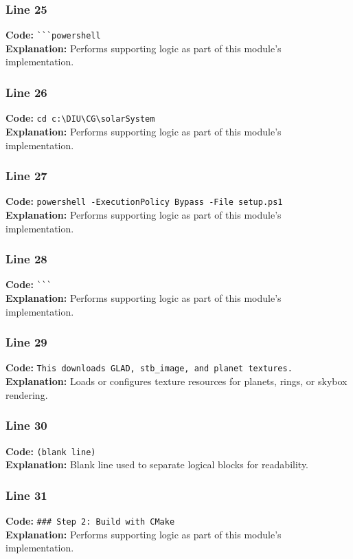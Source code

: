 \documentclass[11pt,a4paper]{article}
\begin{document}
\subsubsection*{Line 25}
\textbf{Code:} \verb|```powershell|\\
\textbf{Explanation:} Performs supporting logic as part of this module's implementation.

\subsubsection*{Line 26}
\textbf{Code:} \verb|cd c:\DIU\CG\solarSystem|\\
\textbf{Explanation:} Performs supporting logic as part of this module's implementation.

\subsubsection*{Line 27}
\textbf{Code:} \verb|powershell -ExecutionPolicy Bypass -File setup.ps1|\\
\textbf{Explanation:} Performs supporting logic as part of this module's implementation.

\subsubsection*{Line 28}
\textbf{Code:} \verb|```|\\
\textbf{Explanation:} Performs supporting logic as part of this module's implementation.

\subsubsection*{Line 29}
\textbf{Code:} \verb|This downloads GLAD, stb_image, and planet textures.|\\
\textbf{Explanation:} Loads or configures texture resources for planets, rings, or skybox rendering.

\subsubsection*{Line 30}
\textbf{Code:} \texttt{(blank line)}\\
\textbf{Explanation:} Blank line used to separate logical blocks for readability.

\subsubsection*{Line 31}
\textbf{Code:} \verb|### Step 2: Build with CMake|\\
\textbf{Explanation:} Performs supporting logic as part of this module's implementation.
\end{document}
